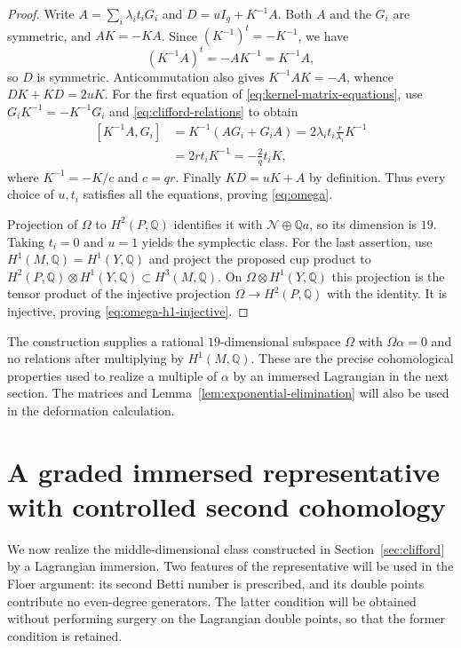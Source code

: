 \documentclass[11pt]{article}
\numberwithin{equation}{section}
\theoremstyle{definition}
\theoremstyle{remark}
\begin{document}
\begin{proof}
Write $A=\sum_i\lambda_it_iG_i$ and $D=uI_g+K^{-1}A$.
Both $A$ and the $G_i$ are symmetric, and $AK=-KA$.
Since $(K^{-1})^t=-K^{-1}$, we have
\[
 (K^{-1}A)^t=-AK^{-1}=K^{-1}A,
\]
so $D$ is symmetric.  Anticommutation also gives
$K^{-1}AK=-A$, whence $DK+KD=2uK$.
For the first equation of \eqref{eq:kernel-matrix-equations}, use
$G_iK^{-1}=-K^{-1}G_i$ and \eqref{eq:clifford-relations} to obtain
\[
 \begin{aligned}
 [K^{-1}A,G_i]
   &=K^{-1}(AG_i+G_iA)
     =2\lambda_it_i\frac r{\lambda_i}K^{-1}\\
   &=2rt_iK^{-1}
     =-\frac2q t_iK,
 \end{aligned}
\]
where $K^{-1}=-K/c$ and $c=qr$.
Finally $KD=uK+A$ by definition.  Thus every choice of $u,t_i$
satisfies all the equations, proving \eqref{eq:omega}.

Projection of $\Omega$ to $H^2(P,\mathbb Q)$ identifies it with
$\mathcal N\oplus\mathbb Q a$, so its dimension is $19$.
Taking $t_i=0$ and $u=1$ yields the symplectic class.
For the last assertion, use $H^1(M,\mathbb Q)=H^1(Y,\mathbb Q)$ and project
the proposed cup product to
$H^2(P,\mathbb Q)\otimes H^1(Y,\mathbb Q)\subset H^3(M,\mathbb Q)$.
On $\Omega\otimes H^1(Y,\mathbb Q)$ this projection is the tensor product
of the injective projection $\Omega\to H^2(P,\mathbb Q)$ with the identity.
It is injective, proving \eqref{eq:omega-h1-injective}.
\end{proof}

The construction supplies a rational $19$-dimensional subspace
$\Omega$ with $\Omega\alpha=0$ and no relations after multiplying
by $H^1(M,\mathbb Q)$.  These are the precise cohomological properties used
to realize a multiple of $\alpha$ by an immersed Lagrangian in the
next section.  The matrices and Lemma~\ref{lem:exponential-elimination}
will also be used in the deformation calculation.


\section{A graded immersed representative with controlled second cohomology}
\label{sec:topology}

We now realize the middle-dimensional class constructed in
Section~\ref{sec:clifford} by a Lagrangian immersion.  Two features of the
representative will be used in the Floer argument: its second Betti number
is prescribed, and its double points contribute no even-degree generators.
The latter condition will be obtained without performing surgery on the
Lagrangian double points, so that the former condition is retained.
\end{document}
